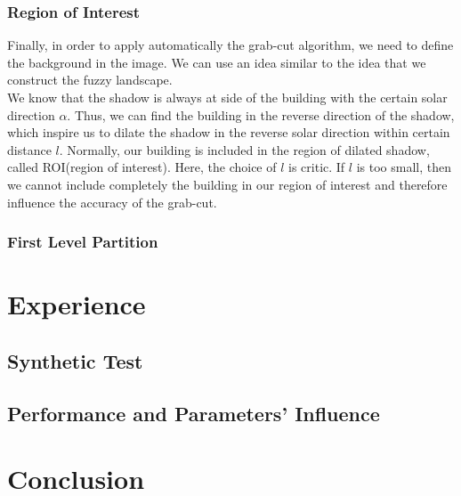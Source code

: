 \documentclass[runningheads]{llncs}
\begin{document}
\subsubsection{Region of Interest}
Finally, in order to apply automatically the grab-cut algorithm, we need to define the background in the image. We can use an idea similar to the idea that we construct the fuzzy landscape.\\
We know that the shadow is always at side of the building with the certain solar direction $\alpha$. Thus, we can find the building in the reverse direction of the shadow, which inspire us to dilate the shadow in the reverse solar direction within certain distance $l$. Normally, our building is included in the region of dilated shadow, called ROI(region of interest). Here, the choice of $l$ is critic. If $l$ is too small, then we cannot include completely the building in our region of interest and therefore influence the accuracy of the grab-cut. 
\subsubsection{First Level Partition}


\section{Experience}
\subsection{Synthetic Test}
\subsection{Performance and Parameters' Influence}

\section{Conclusion}
\newpage



\end{document}
